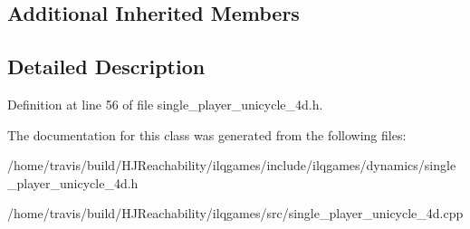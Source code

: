 \subsection*{Additional Inherited Members}


\subsection{Detailed Description}


Definition at line 56 of file single\+\_\+player\+\_\+unicycle\+\_\+4d.\+h.



The documentation for this class was generated from the following files\+:\begin{DoxyCompactItemize}
\item 
/home/travis/build/\+H\+J\+Reachability/ilqgames/include/ilqgames/dynamics/single\+\_\+player\+\_\+unicycle\+\_\+4d.\+h\item 
/home/travis/build/\+H\+J\+Reachability/ilqgames/src/single\+\_\+player\+\_\+unicycle\+\_\+4d.\+cpp\end{DoxyCompactItemize}
